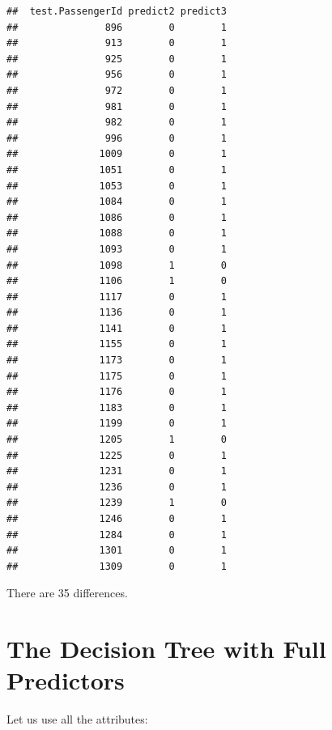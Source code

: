 \documentclass[
]{book}
\begin{document}
\begin{verbatim}
##  test.PassengerId predict2 predict3
##               896        0        1
##               913        0        1
##               925        0        1
##               956        0        1
##               972        0        1
##               981        0        1
##               982        0        1
##               996        0        1
##              1009        0        1
##              1051        0        1
##              1053        0        1
##              1084        0        1
##              1086        0        1
##              1088        0        1
##              1093        0        1
##              1098        1        0
##              1106        1        0
##              1117        0        1
##              1136        0        1
##              1141        0        1
##              1155        0        1
##              1173        0        1
##              1175        0        1
##              1176        0        1
##              1183        0        1
##              1199        0        1
##              1205        1        0
##              1225        0        1
##              1231        0        1
##              1236        0        1
##              1239        1        0
##              1246        0        1
##              1284        0        1
##              1301        0        1
##              1309        0        1
\end{verbatim}

There are 35 differences.

\hypertarget{the-decision-tree-with-full-predictors}{%
\section{The Decision Tree with Full Predictors}\label{the-decision-tree-with-full-predictors}}

Let us use all the attributes:
\end{document}
